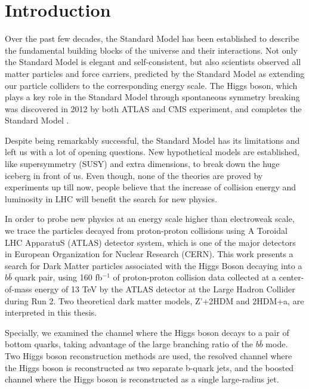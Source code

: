 \chapter{Introduction}

\label{ch:intro}
\par Over the past few decades, the Standard Model has been established to describe the fundamental building blocks of the universe and their interactions.
 Not only the Standard Model is elegant and self-consistent, but also scientists observed all matter particles and force carriers, predicted by the Standard Model as extending our particle colliders to the corresponding energy scale.
The Higgs boson, which plays a key role in the Standard Model through spontaneous symmetry breaking was discovered in 2012 by both ATLAS and CMS experiment, 
and completes the Standard Model\cite{Aad:2012tfa} \cite{Chatrchyan:2012xdj}.

\par Despite being remarkably successful, the Standard Model has its limitations and left us with a lot of opening questions. 
New hypothetical models are established, like supersymmetry (SUSY) and extra dimensions,
to break down the huge iceberg in front of us. Even though, none of the theories are proved by experiments up till now, 
people believe that the increase of collision energy and luminosity in LHC will benefit the search for new physics.

\par In order to probe new physics at an energy scale higher than electroweak scale,
 we trace the particles decayed from proton-proton collisions using A Toroidal LHC ApparatuS (ATLAS) detector system,
 which is one of the major detectors in European Organization for Nuclear Research (CERN). This work presents a search for Dark Matter particles associated
with the Higgs Boson decaying into a $b\bar{b}$ quark pair, using 160 fb$ ^{-1}$ of proton-proton collision data collected at a center-of-mass energy of 13 TeV
by the ATLAS detector at the Large Hadron Collider during Run 2. Two theoretical dark matter models, Z'+2HDM and 
2HDM+a, are interpreted in this thesis.

\par Specially, we examined the channel where the Higgs boson decays to a pair of bottom quarks, taking advantage of the large branching ratio of the $b\bar{b}$ mode. 
Two Higgs boson reconstruction methods are used, the resolved channel where the Higgs boson is reconstructed as two separate b-quark jets, 
and the boosted channel where the Higgs boson is reconstructed as a single large-radius jet.


